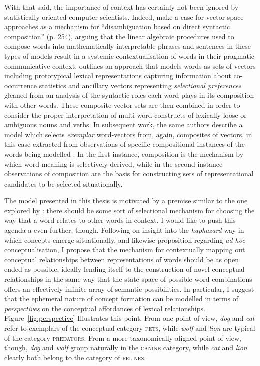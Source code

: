 {With that said, the importance of context has certainly not been ignored by statistically oriented computer scientists.  Indeed, \cite{BaroniEA2014b} make a case for vector space approaches as a mechanism for ``disambiguation based on direct syntactic composition'' (p. 254), arguing that the linear algebraic procedures used to compose words into mathematically interpretable phrases and sentences in these types of models result in a systemic contextualisation of words in their pragmatic communicative context.  \cite{ErkEA2008} outlines an approach that models words as sets of vectors including prototypical lexical representations capturing information about co-occurrence statistics and ancillary vectors representing \emph{selectional preferences} \citep[\emph{per}][]{Wilks1978} gleaned from an analysis of the syntactic roles each word plays in its composition with other words.  These composite vector sets are then combined in order to consider the proper interpretation of multi-word constructs of lexically loose or ambiguous nouns and verbs.  In subsequent work, the same authors describe a model which selects \emph{exemplar} word-vectors from, again, composites of vectors, in this case extracted from observations of specific compositional instances of the words being modelled \citep{ErkEA2010}.  In the first instance, composition is the mechanism by which word meaning is selectively derived, while in the second instance observations of composition are the basis for constructing sets of representational candidates to be selected situationally.

The model presented in this thesis is motivated by a premise similar to the one explored by \citeauthor{ErkEA2008}: there should be some sort of selectional mechanism for choosing the way that a word relates to other words in context.  I would like to push this agenda a even further, though.  Following on  insight into the \emph{haphazard} way in which concepts emerge situationally, and likewise  proposition regarding \emph{ad hoc} conceptualisation, I propose that the mechanism for contextually mapping out conceptual relationships between representations of words should be as open ended as possible, ideally lending itself to the construction of novel conceptual relationships in the same way that the state space of possible word combinations offers an effectively infinite array of semantic possibilities.  In particular, I suggest that the ephemeral nature of concept formation can be modelled in terms of \emph{perspectives} on the conceptual affordances of lexical relationships.  Figure~\ref{fig:perspective} Illustrates this point.  From one point of view, \emph{dog} and \emph{cat} refer to exemplars of the conceptual category \textsc{pets}, while \emph{wolf} and \emph{lion} are typical of the category \textsc{predators}.  From a more taxonomically aligned point of view, though, \emph{dog} and \emph{wolf} group naturally in the \textsc{canine} category, while \emph{cat} and \emph{lion} clearly both belong to the category of \textsc{felines}.

}
